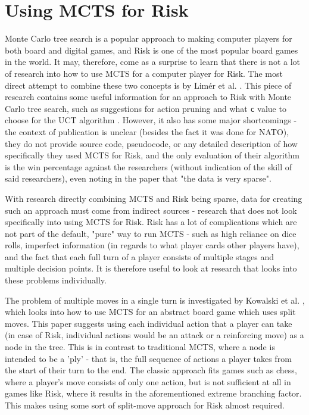 \section{Using MCTS for Risk}
\label{MCTSforRisk}
Monte Carlo tree search is a popular approach to making computer players for both board and digital games, and Risk is one of the most popular board games in the world. It may, therefore, come as a surprise to learn that there is not a lot of research into how to use MCTS for a computer player for Risk. The most direct attempt to combine these two concepts is by Lim{\'e}r et al. \cite{limer2020monte}. This piece of research contains some useful information for an approach to Risk with Monte Carlo tree search, such as suggestions for action pruning and what \texttt{c} value to choose for the UCT algorithm \cite{kocsis2006bandit}. However, it also has some major shortcomings - the context of publication is unclear (besides the fact it was done for NATO), they do not provide source code, pseudocode, or any detailed description of how specifically they used MCTS for Risk, and the only evaluation of their algorithm is the win percentage against the researchers (without indication of the skill of said researchers), even noting in the paper that "the data is very sparse".

With research directly combining MCTS and Risk being sparse, data for creating such an approach must come from indirect sources - research that does not look specifically into using MCTS for Risk. Risk has a lot of complications which are not part of the default, "pure" way to run MCTS - such as high reliance on dice rolls, imperfect information (in regards to what player cards other players have), and the fact that each full turn of a player consists of multiple stages and multiple decision points. It is therefore useful to look at research that looks into these problems individually.

The problem of multiple moves in a single turn is investigated by Kowalski et al. \cite{kowalski2022split}, which looks into how to use MCTS for an abstract board game which uses split moves. This paper suggests using each individual action that a player can take (in case of Risk, individual actions would be an attack or a reinforcing move) as a node in the tree. This is in contrast to traditional MCTS, where a node is intended to be a 'ply' - that is, the full sequence of actions a player takes from the start of their turn to the end. The classic approach fits games such as chess, where a player's move consists of only one action, but is not sufficient at all in games like Risk, where it results in the aforementioned extreme branching factor. This makes using some sort of split-move approach for Risk almost required.

